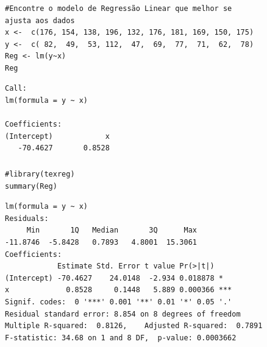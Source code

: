 \documentclass[14pt,aspectratio=1610]{beamer}
\begin{document}
\begin{frame}[fragile]{}
\frametitle{ }
\begin{block}{}
\begin{center}
\begin{verbatim}
#Encontre o modelo de Regressão Linear que melhor se
ajusta aos dados
x <-  c(176, 154, 138, 196, 132, 176, 181, 169, 150, 175)
y <-  c( 82,  49,  53, 112,  47,  69,  77,  71,  62,  78)
Reg <- lm(y~x)
Reg    
\end{verbatim}
\begin{verbatim}
Call:
lm(formula = y ~ x)

Coefficients:
(Intercept)            x  
   -70.4627       0.8528     
\end{verbatim} 
\end{center}
\end{block}
\end{frame}

\begin{frame}[fragile]{}
\frametitle{ }
\begin{block}{}
\begin{center}
\begin{verbatim}
#library(texreg)
summary(Reg)    
\end{verbatim}
\begin{verbatim}
lm(formula = y ~ x)
Residuals:
     Min       1Q   Median       3Q      Max 
-11.8746  -5.8428   0.7893   4.8001  15.3061 
Coefficients:
            Estimate Std. Error t value Pr(>|t|)    
(Intercept) -70.4627    24.0148  -2.934 0.018878 *  
x             0.8528     0.1448   5.889 0.000366 ***
Signif. codes:  0 '***' 0.001 '**' 0.01 '*' 0.05 '.' 
Residual standard error: 8.854 on 8 degrees of freedom
Multiple R-squared:  0.8126,	Adjusted R-squared:  0.7891 
F-statistic: 34.68 on 1 and 8 DF,  p-value: 0.0003662  
\end{verbatim}
\end{center}
\end{block}
\end{frame}
\end{document}
